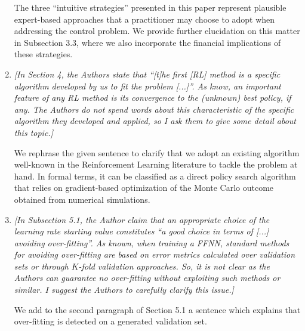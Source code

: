\documentclass{article}
\newcommand{\quotations}[1]{``#1''}
\begin{document}
\begin{enumerate}
 The three \quotations{intuitive strategies} presented in this paper represent plausible expert-based approaches that a practitioner may choose to adopt when addressing the control problem. We provide further elucidation on this matter in Subsection 3.3, where we also incorporate the financial implications of these strategies.
 
 \item \textit{[In Section 4, the Authors state that ``[t]he first [RL] method is a specific algorithm developed by us to fit the problem [...]''. As know, an important feature of any RL method is its convergence to the (unknown) best policy, if any. The Authors do not spend words about this characteristic of the specific algorithm they developed and applied, so I ask them to give some detail about this topic.]} 

 We rephrase the given sentence to clarify that we adopt an existing algorithm well-known in the Reinforcement Learning literature to tackle the problem at hand. In formal terms, it can be classified as a direct policy search algorithm that relies on gradient-based optimization of the Monte Carlo outcome obtained from numerical simulations.

 \item \textit{[In Subsection 5.1, the Author claim that an appropriate choice of the learning rate starting value constitutes ``a good choice in terms of [...] avoiding over-fitting''. As known, when training a FFNN, standard methods for avoiding over-fitting are based on error metrics calculated over validation sets or through $K$-fold validation approaches. So, it is not clear as the Authors can guarantee no over-fitting without exploiting such methods or similar. I suggest the Authors to carefully clarify this issue.]} 
 
We add to the second paragraph of Section 5.1 a sentence which explains that over-fitting is detected on a generated validation set.

 \end{enumerate}
\end{document}
